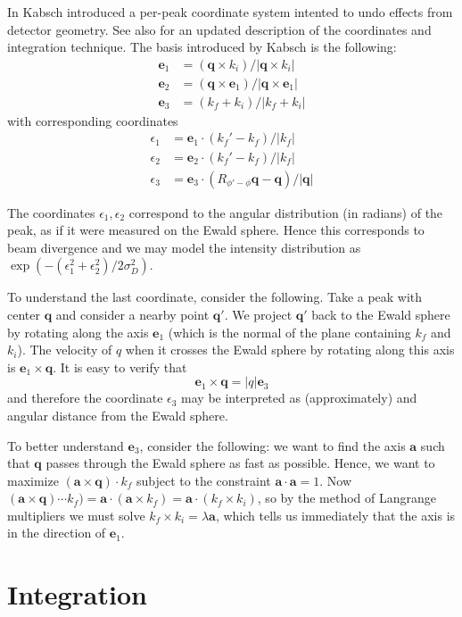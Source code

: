 \documentclass[twocolumn,preprintnumbers,amsmath,amssymb]{revtex4}
\newcommand{\ba}{\mathbf{a}}
\newcommand{\be}{\mathbf{e}}
\newcommand{\bq}{\mathbf{q}}
\begin{document}
In \cite{Kab88} Kabsch introduced a per-peak coordinate system intented to undo effects from detector geometry.
See also \cite{Kab10b} for an updated description of the coordinates and integration technique.
The basis introduced by Kabsch is the following:
\begin{align}
  \be_1 &= (\bq \times k_i) / |\bq \times k_i| \\
  \be_2 &= (\bq \times \be_1) / |\bq \times \be_1| \\
  \be_3 &= (k_f + k_i) / |k_f + k_i|
\end{align}
with corresponding coordinates
\begin{align}
  \epsilon_1 &= \be_1 \cdot (k_f'-k_f) / |k_f| \\
  \epsilon_2 &= \be_2 \cdot (k_f'-k_f) / |k_f| \\
  \epsilon_3 &= \be_3 \cdot (R_{\phi'-\phi}\bq-\bq) / |\bq|
\end{align}

The coordinates $\epsilon_1, \epsilon_2$ correspond to the angular distribution (in radians) of the peak, as if it were measured on the Ewald sphere. Hence this corresponds to beam divergence and we may model the intensity distribution as $\exp(-(\epsilon_1^2 + \epsilon_2^2)/2 \sigma_D^2)$.

To understand the last coordinate, consider the following. Take a peak with center $\bq$ and consider a nearby point $\bq'$. We project $\bq'$ back to the Ewald sphere by rotating along the axis $\be_1$ (which is the normal of the plane containing $k_f$ and $k_i$). The velocity of $q$ when it crosses the Ewald sphere by rotating along this axis is $\be_1 \times \bq$. It is easy to verify that
\begin{equation} \be_1 \times \bq = |q| \be_3 \end{equation}
and therefore the coordinate $\epsilon_3$ may be interpreted as (approximately) and angular distance from the Ewald sphere.

To better understand $\be_3$, consider the following: we want to find the axis $\ba$ such that $\bq$ passes through the Ewald sphere as fast as possible. Hence, we want to maximize $(\ba \times \bq) \cdot k_f$ subject to the constraint $\ba \cdot \ba = 1$.
Now $(\ba \times \bq) \cdots k_f) = \ba \cdot (\ba \times k_f) = \ba \cdot (k_f \times k_i)$, so by the method of Langrange multipliers we must solve $k_f \times k_i = \lambda \ba$, which tells us immediately that the axis is in the direction of $\be_1$.


\section{Integration} \label{integration}
\end{document}
